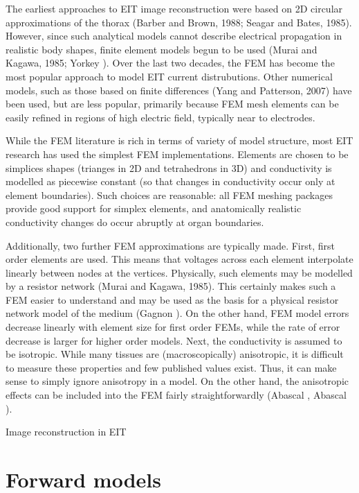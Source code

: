 \documentclass[12pt,draft]{iopart}
\begin{document}
The earliest approaches to EIT image reconstruction were
based on 2D circular approximations of the thorax 
(Barber and Brown, 1988; Seagar and Bates, 1985). However, since
such analytical models cannot describe electrical propagation
in realistic body shapes, finite element models begun to be
used (Murai and Kagawa, 1985; Yorkey ). Over the
last two decades, the FEM has become the most popular approach
to model EIT current distrubutions. Other numerical models,
such as those based on finite differences (Yang and Patterson,
2007) have been used, but are less popular, primarily
because FEM mesh elements can be easily refined in regions
of high electric field, typically near to electrodes.

While the FEM literature is rich in terms of variety of
model structure, most EIT research has used the simplest
FEM implementations. Elements are chosen to be simplices
shapes (trianges in 2D and tetrahedrons in 3D) and conductivity
is modelled as piecewise constant (so that changes in conductivity
occur only at element boundaries). Such choices are reasonable:
all FEM meshing packages provide good support for simplex
elements, and anatomically realistic conductivity changes
do occur abruptly at organ boundaries. 

Additionally, two further FEM approximations are typically made.
First, first order elements are used. This means that voltages
across each element interpolate linearly between nodes at
the vertices. Physically, such elements may be modelled by a
resistor network (Murai and Kagawa, 1985). This certainly
makes such a FEM easier to understand and may be used as
the basis for a physical resistor network model of the medium
(Gagnon ). On the other hand, FEM model errors decrease
linearly with element size for first order FEMs, while the
rate of error decrease is larger for higher order models.
Next, the conductivity is assumed to be isotropic. While many
tissues are (macroscopically) anisotropic, it is difficult to
measure these properties and few published values exist. Thus,
it can make sense to simply ignore anisotropy in a model.
On the other hand, the anisotropic effects can be included
into the FEM fairly straightforwardly (Abascal , 
Abascal ).

Image reconstruction in EIT



\section{Forward models}
\end{document}
